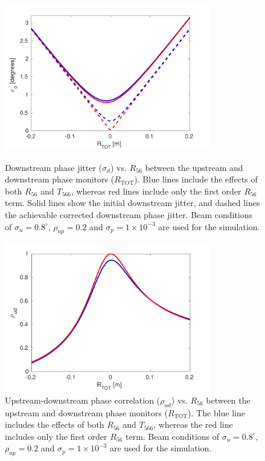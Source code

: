 \begin{figure}
  \centering
  \includegraphics[width=0.8\textwidth]{Figures/propagation/jitVsR56_t566}
  \caption{Downstream phase jitter (\(\sigma_d\)) vs. \(R_{56}\) between the upstream and downstream phase monitors (\(R_{\mathrm{TOT}}\)). Blue lines include the effects of both \(R_{56}\) and \(T_{566}\), whereas red lines include only the first order \(R_{56}\) term. Solid lines show the initial downstream jitter, and dashed lines the achievable corrected downstream phase jitter. Beam conditions of \(\sigma_u = 0.8^\circ\), \(\rho_{up}=0.2\) and \(\sigma_p = 1 \times 10^{-3}\) are used for the simulation.}
  \label{f:jitVsR56_t566}
  \includegraphics[width=0.8\textwidth]{Figures/propagation/corrVsR56_t566}
  \caption{Upstream-downstream phase correlation (\(\rho_{ud}\)) vs. \(R_{56}\) between the upstream and downstream phase monitors (\(R_{\mathrm{TOT}}\)). The blue line includes the effects of both \(R_{56}\) and \(T_{566}\), whereas the red line includes only the first order \(R_{56}\) term.  Beam conditions of \(\sigma_u = 0.8^\circ\), \(\rho_{up}=0.2\) and \(\sigma_p = 1 \times 10^{-3}\) are used for the simulation.}
  \label{f:corrVsR56_t566}
\end{figure}


